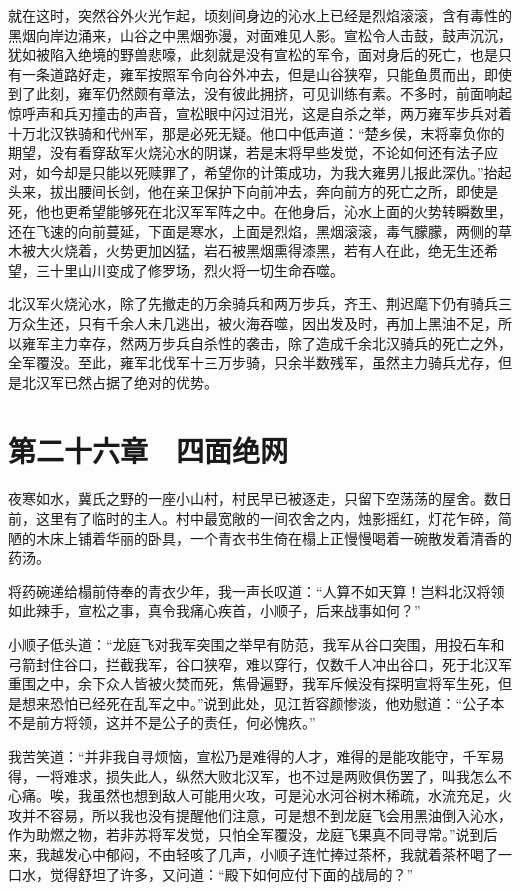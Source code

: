 就在这时，突然谷外火光乍起，顷刻间身边的沁水上已经是烈焰滚滚，含有毒性的黑烟向岸边涌来，山谷之中黑烟弥漫，对面难见人影。宣松令人击鼓，鼓声沉沉，犹如被陷入绝境的野兽悲嚎，此刻就是没有宣松的军令，面对身后的死亡，也是只有一条道路好走，雍军按照军令向谷外冲去，但是山谷狭窄，只能鱼贯而出，即使到了此刻，雍军仍然颇有章法，没有彼此拥挤，可见训练有素。不多时，前面响起惊呼声和兵刃撞击的声音，宣松眼中闪过泪光，这是自杀之举，两万雍军步兵对着十万北汉铁骑和代州军，那是必死无疑。他口中低声道：“楚乡侯，末将辜负你的期望，没有看穿敌军火烧沁水的阴谋，若是末将早些发觉，不论如何还有法子应对，如今却是只能以死赎罪了，希望你的计策成功，为我大雍男儿报此深仇。”抬起头来，拔出腰间长剑，他在亲卫保护下向前冲去，奔向前方的死亡之所，即使是死，他也更希望能够死在北汉军军阵之中。在他身后，沁水上面的火势转瞬数里，还在飞速的向前蔓延，下面是寒水，上面是烈焰，黑烟滚滚，毒气朦朦，两侧的草木被大火烧着，火势更加凶猛，岩石被黑烟熏得漆黑，若有人在此，绝无生还希望，三十里山川变成了修罗场，烈火将一切生命吞噬。

北汉军火烧沁水，除了先撤走的万余骑兵和两万步兵，齐王、荆迟麾下仍有骑兵三万众生还，只有千余人未几逃出，被火海吞噬，因出发及时，再加上黑油不足，所以雍军主力幸存，然两万步兵自杀性的袭击，除了造成千余北汉骑兵的死亡之外，全军覆没。至此，雍军北伐军十三万步骑，只余半数残军，虽然主力骑兵尤存，但是北汉军已然占据了绝对的优势。

\chapter{第二十六章　四面绝网}

夜寒如水，冀氏之野的一座小山村，村民早已被逐走，只留下空荡荡的屋舍。数日前，这里有了临时的主人。村中最宽敞的一间农舍之内，烛影摇红，灯花乍碎，简陋的木床上铺着华丽的卧具，一个青衣书生倚在榻上正慢慢喝着一碗散发着清香的药汤。

将药碗递给榻前侍奉的青衣少年，我一声长叹道：“人算不如天算！岂料北汉将领如此辣手，宣松之事，真令我痛心疾首，小顺子，后来战事如何？”

小顺子低头道：“龙庭飞对我军突围之举早有防范，我军从谷口突围，用投石车和弓箭封住谷口，拦截我军，谷口狭窄，难以穿行，仅数千人冲出谷口，死于北汉军重围之中，余下众人皆被火焚而死，焦骨遍野，我军斥候没有探明宣将军生死，但是想来恐怕已经死在乱军之中。”说到此处，见江哲容颜惨淡，他劝慰道：“公子本不是前方将领，这并不是公子的责任，何必愧疚。”

我苦笑道：“并非我自寻烦恼，宣松乃是难得的人才，难得的是能攻能守，千军易得，一将难求，损失此人，纵然大败北汉军，也不过是两败俱伤罢了，叫我怎么不心痛。唉，我虽然也想到敌人可能用火攻，可是沁水河谷树木稀疏，水流充足，火攻并不容易，所以我也没有提醒他们注意，可是想不到龙庭飞会用黑油倒入沁水，作为助燃之物，若非苏将军发觉，只怕全军覆没，龙庭飞果真不同寻常。”说到后来，我越发心中郁闷，不由轻咳了几声，小顺子连忙捧过茶杯，我就着茶杯喝了一口水，觉得舒坦了许多，又问道：“殿下如何应付下面的战局的？”

